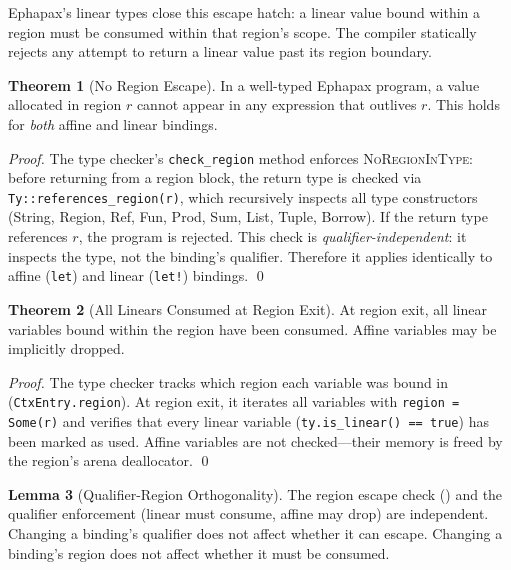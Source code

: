 \documentclass[11pt,a4paper]{article}
\theoremstyle{definition}
\newtheorem{theorem}{Theorem}[section]
\newtheorem{lemma}[theorem]{Lemma}
\begin{document}
Ephapax's linear types close this escape hatch: a linear value bound
within a region must be consumed within that region's scope. The
compiler statically rejects any attempt to return a linear value past
its region boundary.

\begin{theorem}[No Region Escape]
\label{thm:no-escape}
In a well-typed Ephapax program, a value allocated in region $r$
cannot appear in any expression that outlives $r$. This holds for
\emph{both} affine and linear bindings.
\end{theorem}

\begin{proof}
The type checker's \texttt{check\_region} method enforces
\textsc{NoRegionInType}: before returning from a region block, the
return type is checked via \texttt{Ty::references\_region(r)}, which
recursively inspects all type constructors (String, Region, Ref, Fun,
Prod, Sum, List, Tuple, Borrow). If the return type references $r$,
the program is rejected. This check is \emph{qualifier-independent}:
it inspects the type, not the binding's qualifier. Therefore it applies
identically to affine (\texttt{let}) and linear (\texttt{let!})
bindings. \qed
\end{proof}

\begin{theorem}[All Linears Consumed at Region Exit]
\label{thm:all-linears-consumed}
At region exit, all linear variables bound within the region have been
consumed. Affine variables may be implicitly dropped.
\end{theorem}

\begin{proof}
The type checker tracks which region each variable was bound in
(\texttt{CtxEntry.region}). At region exit, it iterates all variables
with \texttt{region = Some(r)} and verifies that every linear variable
(\texttt{ty.is\_linear() == true}) has been marked as used. Affine
variables are not checked---their memory is freed by the region's
arena deallocator. \qed
\end{proof}

\begin{lemma}[Qualifier-Region Orthogonality]
\label{lem:orthogonality}
The region escape check () and the qualifier
enforcement (linear must consume, affine may drop) are independent.
Changing a binding's qualifier does not affect whether it can escape.
Changing a binding's region does not affect whether it must be consumed.
\end{lemma}
\end{document}
